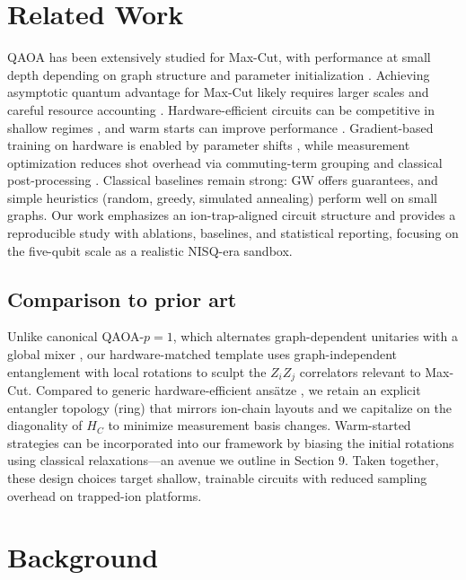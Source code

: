 \section{Related Work}
QAOA has been extensively studied for Max-Cut, with performance at small depth depending on graph structure and parameter initialization \cite{farhi2014qaoa,hadfield2019qaoaops,shaydulin2020qaoa}. Achieving asymptotic quantum advantage for Max-Cut likely requires larger scales and careful resource accounting \cite{guerreschi2019qaoacost}. Hardware-efficient circuits can be competitive in shallow regimes \cite{kandala2017hardware}, and warm starts can improve performance \cite{egger2021warmstart}. Gradient-based training on hardware is enabled by parameter shifts \cite{schuld2019gradients,mitarai2018quantum}, while measurement optimization reduces shot overhead via commuting-term grouping and classical post-processing \cite{huggins2021efficient,verteletskyi2020measurement}. Classical baselines remain strong: GW \cite{goemans1995maxcut} offers guarantees, and simple heuristics (random, greedy, simulated annealing) perform well on small graphs. Our work emphasizes an ion-trap-aligned circuit structure and provides a reproducible study with ablations, baselines, and statistical reporting, focusing on the five-qubit scale as a realistic NISQ-era sandbox.

\subsection{Comparison to prior art}
Unlike canonical QAOA-$p{=}1$, which alternates graph-dependent unitaries with a global mixer \cite{farhi2014qaoa}, our hardware-matched template uses graph-independent entanglement with local rotations to sculpt the $Z_iZ_j$ correlators relevant to Max-Cut. Compared to generic hardware-efficient ans\"atze \cite{kandala2017hardware}, we retain an explicit entangler topology (ring) that mirrors ion-chain layouts and we capitalize on the diagonality of $H_C$ to minimize measurement basis changes. Warm-started strategies \cite{egger2021warmstart} can be incorporated into our framework by biasing the initial rotations using classical relaxations—an avenue we outline in Section 9. Taken together, these design choices target shallow, trainable circuits with reduced sampling overhead on trapped-ion platforms.

\section{Background}
